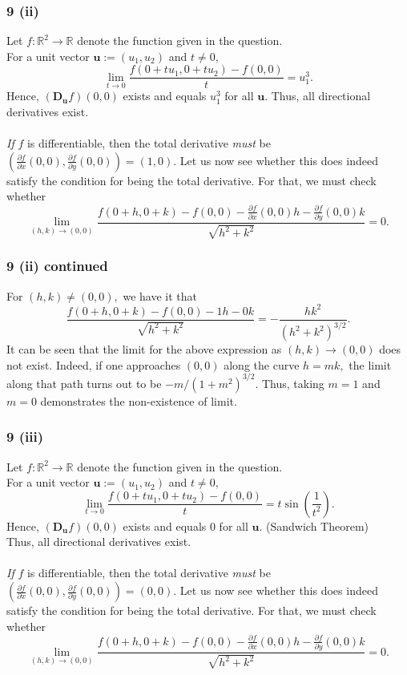 \documentclass[handout]{beamer}
\begin{document}
\begin{frame}
	\frametitle{9 (ii) }
    Let $f:\mathbb{R}^2 \to \mathbb{R}$ denote the function given in the question.\\
	For a unit vector $\textbf{u} := (u_1, u_2)$ and $t \neq 0,$
	\[\lim_{t \to 0} \frac{f\left(0+t u_{1}, 0+t u_{2}\right)-f(0,0)}{t} = u_1^3.\]
	Hence, $\left(\mathbf{D_u} f\right)(0,0)$ exists and equals $u_1^3$ for all $\textbf{u}.$ Thus, all directional derivatives exist.\\~\\
	\emph{If} $f$ is differentiable, then the total derivative \emph{must} be $(\frac{\partial f}{\partial x}(0, 0), \frac{\partial f}{\partial y}(0, 0)) = (1, 0).$ Let us now see whether this does indeed satisfy the condition for being the total derivative. For that, we must check whether
	\[\lim _{(h, k) \rightarrow(0,0)} \frac{f\left(0+h, 0+k\right)-f\left(0, 0\right)-\frac{\partial f}{\partial x}(0,0) h-\frac{\partial f}{\partial y}(0,0) k}{\sqrt{h^{2}+k^{2}}}=0.\]
\end{frame}
\begin{frame}
    \frametitle{9 (ii) continued}

	For $(h,k) \neq (0,0),$ we have it that
	\[\frac{f\left(0+h, 0+k\right)-f\left(0, 0\right)-1h-0 k}{\sqrt{h^{2}+k^{2}}} = -\frac{hk^2}{(h^2 + k^2)^{3/2}}.\]
	It can be seen that the limit for the above expression as $(h, k) \to (0, 0)$ does not exist. Indeed, if one approaches $(0, 0)$ along the curve $h = mk,$ the limit along that path turns out to be $-m/(1 + m^2)^{3/2}.$ Thus, taking $m = 1$ and $m = 0$ demonstrates the non-existence of limit.
\end{frame}
\begin{frame}	
    \frametitle{9 (iii)}

    Let $f:\mathbb{R}^2 \to \mathbb{R}$ denote the function given in the question.\\
	For a unit vector $\textbf{u} := (u_1, u_2)$ and $t \neq 0,$
	\[\lim_{t \to 0} \frac{f\left(0+t u_{1}, 0+t u_{2}\right)-f(0,0)}{t} = t\sin\left(\frac{1}{t^2}\right).\]
	Hence, $\left(\mathbf{D_u} f\right)(0,0)$ exists and equals $0$ for all $\textbf{u}.$ \hfill (Sandwich Theorem)\\
	Thus, all directional derivatives exist.\\~\\
	\emph{If} $f$ is differentiable, then the total derivative \emph{must} be $(\frac{\partial f}{\partial x}(0, 0), \frac{\partial f}{\partial y}(0, 0)) = (0, 0).$ Let us now see whether this does indeed satisfy the condition for being the total derivative. For that, we must check whether
	\[\lim _{(h, k) \rightarrow(0,0)} \frac{f\left(0+h, 0+k\right)-f\left(0, 0\right)-\frac{\partial f}{\partial x}(0,0) h-\frac{\partial f}{\partial y}(0,0) k}{\sqrt{h^{2}+k^{2}}}=0.\]

\end{frame}
\end{document}
